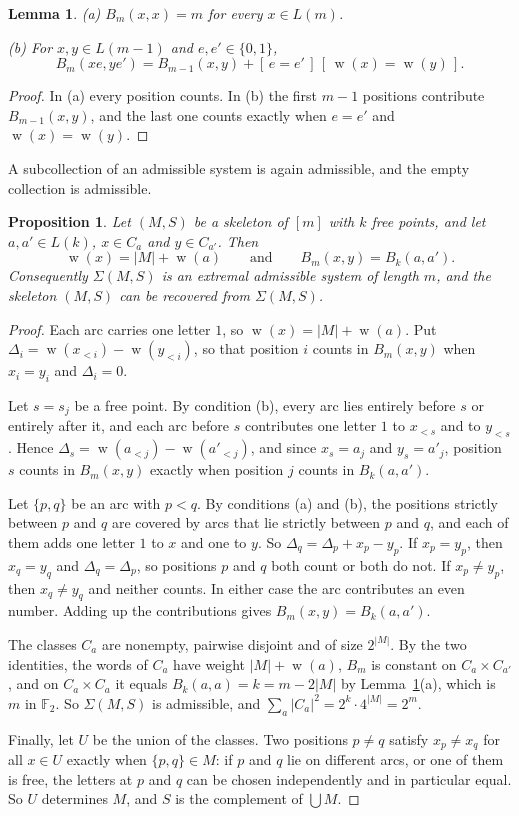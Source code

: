 \documentclass[11pt]{amsart}
\newtheorem{proposition}[theorem]{Proposition}
\newtheorem{lemma}[theorem]{Lemma}
\theoremstyle{definition}
\theoremstyle{remark}
\numberwithin{equation}{section}
\newcommand{\F}{\mathbb{F}}
\newcommand{\Iv}[1]{[\,#1\,]}
\DeclareMathOperator{\wt}{w}
\begin{document}
\begin{lemma}\label{lem:basic}
\textup{(a)} $B_m(x,x)=m$ for every $x\in L(m)$.

\textup{(b)} For $x,y\in L(m-1)$ and $e,e'\in\{0,1\}$,
\[
B_m(xe,ye')=B_{m-1}(x,y)+\Iv{e=e'}\,\Iv{\wt(x)=\wt(y)} .
\]
\end{lemma}

\begin{proof}
In (a) every position counts. In (b) the first $m-1$ positions contribute $B_{m-1}(x,y)$, and the last one counts exactly when $e=e'$ and $\wt(x)=\wt(y)$.
\end{proof}

A subcollection of an admissible system is again admissible, and the empty collection is admissible.

\begin{proposition}\label{prop:skeleton}
Let $(M,S)$ be a skeleton of $[m]$ with $k$ free points, and let $a,a'\in L(k)$, $x\in C_a$ and $y\in C_{a'}$. Then
\[
\wt(x)=|M|+\wt(a)\qquad\text{and}\qquad B_m(x,y)=B_k(a,a').
\]
Consequently $\Sigma(M,S)$ is an extremal admissible system of length $m$, and the skeleton $(M,S)$ can be recovered from $\Sigma(M,S)$.
\end{proposition}

\begin{proof}
Each arc carries one letter $1$, so $\wt(x)=|M|+\wt(a)$. Put $\Delta_i=\wt(x_{<i})-\wt(y_{<i})$, so that position $i$ counts in $B_m(x,y)$ when $x_i=y_i$ and $\Delta_i=0$.

Let $s=s_j$ be a free point. By condition (b), every arc lies entirely before $s$ or entirely after it, and each arc before $s$ contributes one letter $1$ to $x_{<s}$ and to $y_{<s}$. Hence $\Delta_s=\wt(a_{<j})-\wt(a'_{<j})$, and since $x_s=a_j$ and $y_s=a'_j$, position $s$ counts in $B_m(x,y)$ exactly when position $j$ counts in $B_k(a,a')$.

Let $\{p,q\}$ be an arc with $p<q$. By conditions (a) and (b), the positions strictly between $p$ and $q$ are covered by arcs that lie strictly between $p$ and $q$, and each of them adds one letter $1$ to $x$ and one to $y$. So $\Delta_q=\Delta_p+x_p-y_p$. If $x_p=y_p$, then $x_q=y_q$ and $\Delta_q=\Delta_p$, so positions $p$ and $q$ both count or both do not. If $x_p\ne y_p$, then $x_q\ne y_q$ and neither counts. In either case the arc contributes an even number. Adding up the contributions gives $B_m(x,y)=B_k(a,a')$.

The classes $C_a$ are nonempty, pairwise disjoint and of size $2^{|M|}$. By the two identities, the words of $C_a$ have weight $|M|+\wt(a)$, $B_m$ is constant on $C_a\times C_{a'}$, and on $C_a\times C_a$ it equals $B_k(a,a)=k=m-2|M|$ by Lemma~\ref{lem:basic}(a), which is $m$ in $\F_2$. So $\Sigma(M,S)$ is admissible, and $\sum_a|C_a|^2=2^k\cdot 4^{|M|}=2^m$.

Finally, let $U$ be the union of the classes. Two positions $p\ne q$ satisfy $x_p\ne x_q$ for all $x\in U$ exactly when $\{p,q\}\in M$: if $p$ and $q$ lie on different arcs, or one of them is free, the letters at $p$ and $q$ can be chosen independently and in particular equal. So $U$ determines $M$, and $S$ is the complement of $\bigcup M$.
\end{proof}
\end{document}
